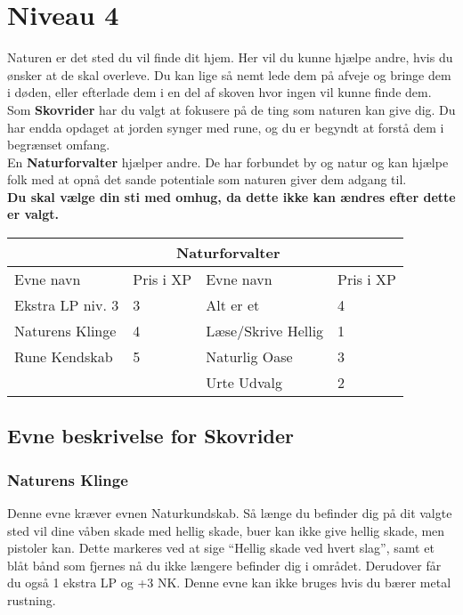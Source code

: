 \chapter{Niveau 4}
Naturen er det sted du vil finde dit hjem. Her vil du kunne hjælpe andre, hvis du ønsker at de skal overleve. Du kan lige så nemt lede dem på afveje og bringe dem i døden, eller efterlade dem i en del af skoven hvor ingen vil kunne finde dem.\\
Som \textbf{Skovrider} har du valgt at fokusere på de ting som naturen kan give dig. Du har endda opdaget at jorden synger med rune, og du er begyndt at forstå dem i begrænset omfang.\\ 
En \textbf{Naturforvalter} hjælper andre. De har forbundet by og natur og kan hjælpe folk med at opnå det sande potentiale som naturen giver dem adgang til.\\

\textbf{Du skal vælge din sti med omhug, da dette ikke kan ændres efter dette er valgt.}\\

\begin{tabular}{|p{}|p{}|p{}|p{}|}
\hline
\rowcolor{cerulean!80}
 \multicolumn{2}{|c|}{ Skovrider } & \multicolumn{2}{|c|}{ Naturforvalter }\\
\hline
\rowcolor{cerulean!40}
    Evne navn & Pris i XP & Evne navn & Pris i XP\\ \hline
    Ekstra LP niv. 3 & 3 & Alt er et & 4 \\\hline
    Naturens Klinge & 4 & Læse/Skrive Hellig & 1  \\\hline
    Rune Kendskab & 5 & Naturlig Oase & 3\\\hline
    &&Urte Udvalg &2 \\\hline

\end{tabular}

\section{Evne beskrivelse for Skovrider}



\subsection{Naturens Klinge}
Denne evne kræver evnen Naturkundskab. Så længe du befinder dig på dit valgte sted vil dine våben skade med hellig skade, buer kan ikke give hellig skade, men pistoler kan. Dette markeres ved at sige “Hellig skade ved hvert slag”, samt et blåt bånd som fjernes nå du ikke længere befinder dig i området. Derudover får du også 1 ekstra LP og +3 NK. Denne evne kan ikke bruges hvis du bærer metal rustning.


